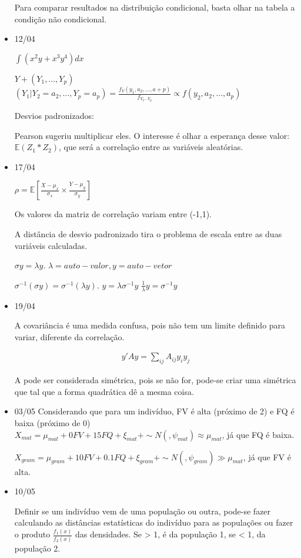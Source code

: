\documentclass[11pt,a4paper]{book}
\begin{document}
\begin{itemize}
		 Para comparar resultados na distribuição condicional, basta olhar na tabela a condição não condicional.
		 
		 \item 12/04
		 
		 $\int (x^2y+x^3y^4)dx$
		 
		 $Y+(Y_1,\ldots,Y_p)$
		 $(Y_1|Y_2=a_2,\ldots,Y_p=a_p)=\frac{f_Y(y_1,a_2,\ldots,a+p)}{f_{Y_2\ldots Y_p}}\propto f(y_2,a_2,\ldots,a_p)$
		 
		 Desvios padronizados:
		 
		 Pearson sugeriu multiplicar eles.
		 O interesse é olhar a esperança desse valor: $\mathbb{E}(Z_1*Z_2)$, que será a correlação entre as variáveis aleatórias.
		 
		 \item 17/04
		 
		 $\rho=\mathbb{E}[\frac{X-\mu_x}{\sigma_x}\times\frac{Y-\mu_y}{\sigma_y}]$
		 
		 Os valores da matriz de correlação variam entre (-1,1).
		 
		 A distância de desvio padronizado tira o problema de escala entre as duas variáveis calculadas.
		 
		 $\sigma y=\lambda y$.
		 $\lambda= auto-valor, y=auto-vetor$
		 
		 
		 $\sigma^{-1}(\sigma y)=\sigma^{-1}(\lambda y)$.
		 $y=\lambda\sigma^{-1}y$
		 $\frac{1}{\lambda}y=\sigma^{-1}y$
		 
		 \item 19/04
		 
		 A covariância é uma medida confusa, pois não tem um limite definido para variar, diferente da correlação.
		 
		 \begin{eqnarray*}
		 	y'Ay=\sum_{ij}A_{ij}y_iy_j
		 \end{eqnarray*}
		 
		 A pode ser considerada simétrica, pois se não for, pode-se criar uma simétrica que tal que a forma quadrática dê a mesma coisa.
		 
		 \item 03/05
		 Considerando que para um indivíduo, FV é alta (próximo de 2) e FQ é baixa (próximo de 0)
		 $X_{mat}=\mu_{mat}+0FV+15FQ+\xi_{mat}+\sim N(,\psi_{mat})\approx \mu_{mat}$, já que FQ é baixa.
		 
		 $X_{gram}=\mu_{gram}+10FV+0.1FQ+\xi_{gram}+\sim N(,\psi_{gram})\gg \mu_{mat}$, já que FV é alta.
		 
		 \item
		 10/05
		 
		 Definir se um indivíduo vem de uma população ou outra, pode-se fazer calculando as distâncias estatísticas do indivíduo para as populações ou fazer o produto $\frac{f_1(x)}{f_2(x)}$ das densidades.
		 Se > 1, é da população 1, se <  1, da população 2.
		 
	\end{itemize}
\end{document}
